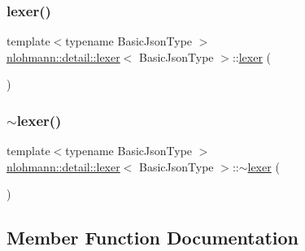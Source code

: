 \subsubsection{\texorpdfstring{lexer()}{lexer()}\hspace{0.1cm}{\footnotesize\ttfamily [3/3]}}
{\footnotesize\ttfamily template$<$typename Basic\+Json\+Type $>$ \\
\hyperlink{classnlohmann_1_1detail_1_1lexer}{nlohmann\+::detail\+::lexer}$<$ Basic\+Json\+Type $>$\+::\hyperlink{classnlohmann_1_1detail_1_1lexer}{lexer} (\begin{DoxyParamCaption}\item[{\hyperlink{classnlohmann_1_1detail_1_1lexer}{lexer}$<$ Basic\+Json\+Type $>$ \&\&}]{ }\end{DoxyParamCaption})\hspace{0.3cm}{\ttfamily [delete]}}

\mbox{\label{classnlohmann_1_1detail_1_1lexer_a2f2ef6f5aca9a0c48fcfb1290f7b2b0d}} 
\subsubsection{\texorpdfstring{$\sim$lexer()}{~lexer()}}
{\footnotesize\ttfamily template$<$typename Basic\+Json\+Type $>$ \\
\hyperlink{classnlohmann_1_1detail_1_1lexer}{nlohmann\+::detail\+::lexer}$<$ Basic\+Json\+Type $>$\+::$\sim$\hyperlink{classnlohmann_1_1detail_1_1lexer}{lexer} (\begin{DoxyParamCaption}{ }\end{DoxyParamCaption})\hspace{0.3cm}{\ttfamily [default]}}



\subsection{Member Function Documentation}
\mbox{\label{classnlohmann_1_1detail_1_1lexer_acec899d31af1fd647911e46e8535c283}} 
